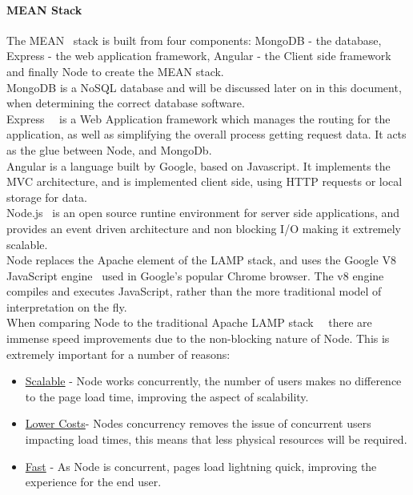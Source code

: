 \documentclass[preprint,12pt,3p]{elsarticle}
\begin{document}
\paragraph{MEAN Stack}
The MEAN~\cite{mean} stack is built from four components: MongoDB - the database, Express - the web application framework, Angular - the Client side framework and finally Node to create the MEAN stack.\\
MongoDB is a NoSQL database and will be discussed later on in this document, when determining the correct database software.\\
Express~\cite{express}~\cite{whatisexpress} is a Web Application framework which manages the routing for the application, as well as simplifying the overall process getting request data. It acts as the glue between Node, and MongoDb.\\
Angular is a language built by Google, based on Javascript. It implements the MVC architecture, and is implemented client side, using HTTP requests or local storage for data.\\
Node.js~\cite{nodejs} is an open source runtine environment for server side applications, and provides an event driven architecture and non blocking I/O making it extremely scalable.\\
Node replaces the Apache element of the LAMP stack, and uses the Google V8 JavaScript engine~\cite{v8engine} used in Google's popular Chrome browser. The v8 engine compiles and executes JavaScript, rather than the more traditional model of interpretation on the fly.\\
When comparing Node to the traditional Apache LAMP stack~\cite{phpvsnodejs}~\cite{nodejsvsapache} there are immense speed improvements due to the non-blocking nature of Node. This is extremely important for a number of reasons:
\begin{itemize}
  \item \underline{Scalable} - Node works concurrently, the number of users makes no difference to the page load time, improving the aspect of scalability.
  \item \underline{Lower Costs}- Nodes concurrency removes the issue of concurrent users impacting load times, this means that less physical resources will be required.
  \item \underline{Fast} - As Node is concurrent, pages load lightning quick, improving the experience for the end user.
\end{itemize}
\end{document}
